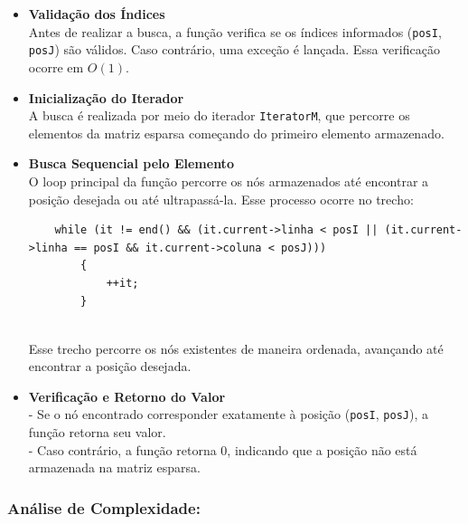 \documentclass[12pt]{article}
\begin{document}
            \begin{itemize} 
                \item  \textbf{Validação dos Índices} \\ 
                   Antes de realizar a busca, a função verifica se os índices informados (\texttt{posI}, \texttt{posJ}) são válidos. Caso contrário, uma exceção é lançada. Essa verificação ocorre em \(O(1)\).  
                
                \item \textbf{Inicialização do Iterador} \\
                   A busca é realizada por meio do iterador \texttt{IteratorM}, que percorre os elementos da matriz esparsa começando do primeiro elemento armazenado.  
                
                \item \textbf{Busca Sequencial pelo Elemento} \\
                   O loop principal da função percorre os nós armazenados até encontrar a posição desejada ou até ultrapassá-la. Esse processo ocorre no trecho:  
        
            \begin{lstlisting}
    while (it != end() && (it.current->linha < posI || (it.current->linha == posI && it.current->coluna < posJ)))
        {
            ++it;
        }
        
            \end{lstlisting}
               
               Esse trecho percorre os nós existentes de maneira ordenada, avançando até encontrar a posição desejada.  
            
            \item \textbf{Verificação e Retorno do Valor} \\
               - Se o nó encontrado corresponder exatamente à posição (\texttt{posI}, \texttt{posJ}), a função retorna seu valor.  \\
               - Caso contrário, a função retorna 0, indicando que a posição não está armazenada na matriz esparsa.  
            
            \end{itemize}

        \subsubsection{Análise de Complexidade:}
        
\end{document}
